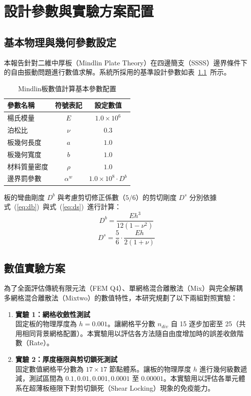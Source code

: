 \chapter{設計參數與實驗方案配置}

\section{基本物理與幾何參數設定}
本報告針對二維中厚板（Mindlin Plate Theory）在四邊簡支（SSSS）邊界條件下的自由振動問題進行數值求解。系統所採用的基準設計參數如表~\ref{tab:parameters}~所示。

\begin{table}[h]
\centering
\caption{Mindlin板數值計算基本參數配置}
\label{tab:parameters}
\begin{tabular}{lcc}
\toprule
參數名稱 & 符號表記 & 設定數值 \\
\midrule
楊氏模量 & $E$ & $1.0 \times 10^6$ \\
泊松比 & $\nu$ & $0.3$ \\
板幾何長度 & $a$ & $1.0$ \\
板幾何寬度 & $b$ & $1.0$ \\
材料質量密度 & $\rho$ & $1.0$ \\
邊界罰參數 & $\alpha^w$ & $1.0 \times 10^8 \cdot D^b$ \\
\bottomrule
\end{tabular}
\end{table}

\noindent 板的彎曲剛度 $D^b$ 與考慮剪切修正係數（$5/6$）的剪切剛度 $D^s$ 分別依據式~(\ref{eq:db})~與式~(\ref{eq:ds})~進行計算：
\begin{equation}
D^b = \frac{E h^3}{12(1-\nu^2)}
\label{eq:db}
\end{equation}
\begin{equation}
D^s = \frac{5}{6} \cdot \frac{E h}{2(1+\nu)}
\label{eq:ds}
\end{equation}

\section{數值實驗方案}
為了全面評估傳統有限元法（FEM Q4）、單網格混合離散法（Mix）與完全解耦多網格混合離散法（Mixtwo）的數值特性，本研究規劃了以下兩組對照實驗：

\begin{enumerate}
\item \textbf{實驗 1：網格收斂性測試} \\
固定板的物理厚度為 $h = 0.001$。讓網格平分數 $n_{div}$ 自 15 逐步加密至 25（共用相同背景網格配置）。本實驗用以評估各方法隨自由度增加時的誤差收斂階數（Rate）。
\item \textbf{實驗 2：厚度極限與剪切鎖死測試} \\
固定數值網格平分數為 $17 \times 17$ 節點體系。讓板的物理厚度 $h$ 進行幾何級數遞減，測試區間為 $0.1, 0.01, 0.001, 0.0001$ 至 $0.00001$。本實驗用以評估各單元體系在超薄板極限下對剪切鎖死（Shear Locking）現象的免疫能力。
\end{enumerate}